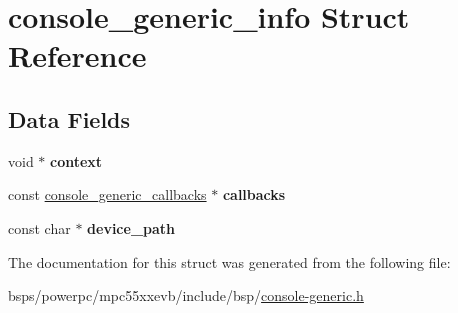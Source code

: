 \hypertarget{structconsole__generic__info}{}\section{console\+\_\+generic\+\_\+info Struct Reference}
\label{structconsole__generic__info}
\subsection*{Data Fields}
\begin{DoxyCompactItemize}
\item 
\mbox{\label{structconsole__generic__info_ab3eb7491ff2a36a01e9b82c9b75e0fc5}} 
void $\ast$ {\bfseries context}
\item 
\mbox{\label{structconsole__generic__info_a080481e718f5be289199341cc4fed812}} 
const \mbox{\hyperlink{structconsole__generic__callbacks}{console\+\_\+generic\+\_\+callbacks}} $\ast$ {\bfseries callbacks}
\item 
\mbox{\label{structconsole__generic__info_a1ad2167b5267fec5abab963656577f4c}} 
const char $\ast$ {\bfseries device\+\_\+path}
\end{DoxyCompactItemize}


The documentation for this struct was generated from the following file\+:\begin{DoxyCompactItemize}
\item 
bsps/powerpc/mpc55xxevb/include/bsp/\mbox{\hyperlink{console-generic_8h}{console-\/generic.\+h}}\end{DoxyCompactItemize}
